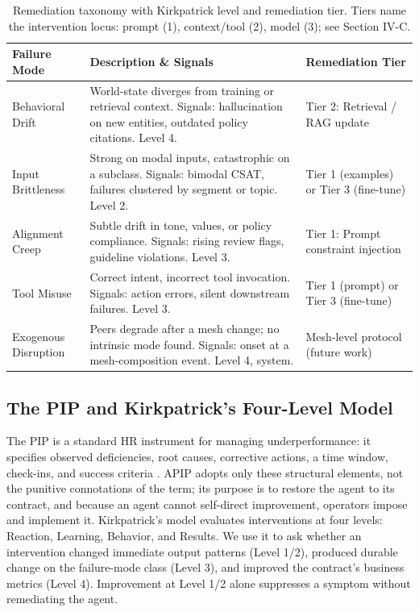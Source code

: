 \documentclass[conference]{IEEEtran}
\begin{document}
\begin{table}[!t]
\caption{Remediation taxonomy with Kirkpatrick level and remediation tier. Tiers name the intervention locus: prompt (1), context/tool (2), model (3); see Section IV-C.}
\label{tab:taxonomy}
\centering
\footnotesize
\renewcommand{\arraystretch}{1.1}
\begin{tabular}{|>{\raggedright\arraybackslash}p{}|>{\raggedright\arraybackslash}p{}|>{\raggedright\arraybackslash}p{}|}
\hline
\textbf{Failure Mode} & \textbf{Description \& Signals} & \textbf{Remediation Tier} \\
\hline
Behavioral Drift & World-state diverges from training or retrieval context. Signals: hallucination on new entities, outdated policy citations. Level 4. & Tier 2: Retrieval / RAG update \\
\hline
Input Brittleness & Strong on modal inputs, catastrophic on a subclass. Signals: bimodal CSAT, failures clustered by segment or topic. Level 2. & Tier 1 (examples) or Tier 3 (fine-tune) \\
\hline
Alignment Creep & Subtle drift in tone, values, or policy compliance. Signals: rising review flags, guideline violations. Level 3. & Tier 1: Prompt constraint injection \\
\hline
Tool Misuse & Correct intent, incorrect tool invocation. Signals: action errors, silent downstream failures. Level 3. & Tier 1 (prompt) or Tier 3 (fine-tune) \\
\hline
Exogenous Disruption & Peers degrade after a mesh change; no intrinsic mode found. Signals: onset at a mesh-composition event. Level 4, system. & Mesh-level protocol (future work) \\
\hline
\end{tabular}
\end{table}

\subsection{The PIP and Kirkpatrick's Four-Level Model}

The PIP is a standard HR instrument for managing underperformance: it specifies observed deficiencies, root causes, corrective actions, a time window, check-ins, and success criteria \cite{ref21}. APIP adopts only these structural elements, not the punitive connotations of the term; its purpose is to restore the agent to its contract, and because an agent cannot self-direct improvement, operators impose and implement it. Kirkpatrick's model \cite{ref7,ref13} evaluates interventions at four levels: Reaction, Learning, Behavior, and Results. We use it to ask whether an intervention changed immediate output patterns (Level 1/2), produced durable change on the failure-mode class (Level 3), and improved the contract's business metrics (Level 4). Improvement at Level 1/2 alone suppresses a symptom without remediating the agent.
\end{document}
